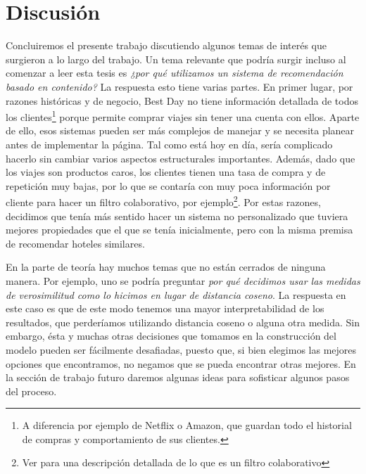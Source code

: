 \documentclass[12pt]{report}
\begin{document}
\section{Discusión}

Concluiremos el presente trabajo discutiendo algunos temas de interés que surgieron a lo largo del trabajo. Un tema relevante que podría surgir incluso al comenzar a leer esta tesis es \emph{¿por qué utilizamos un sistema de recomendación basado en contenido?} La respuesta esto tiene varias partes. En primer lugar, por razones históricas y de negocio, Best Day no tiene información detallada de todos los clientes\footnote{A diferencia por ejemplo de Netflix o Amazon, que guardan todo el historial de compras y comportamiento de sus clientes.} porque permite comprar viajes sin tener una cuenta con ellos. Aparte de ello, esos sistemas pueden ser más complejos de manejar y se necesita planear antes de implementar la página. Tal como está hoy en día, sería complicado hacerlo sin cambiar varios aspectos estructurales importantes. Además, dado que los viajes son productos caros, los clientes tienen una tasa de compra y de repetición muy bajas, por lo que se contaría con muy poca información por cliente para hacer un filtro colaborativo, por ejemplo\footnote{Ver \cite{mmds} para una descripción detallada de lo que es un filtro colaborativo}. Por estas razones, decidimos que tenía más sentido hacer un sistema no personalizado que tuviera mejores propiedades que el que se tenía inicialmente, pero con la misma premisa de recomendar hoteles similares.

En la parte de teoría hay muchos temas que no están cerrados de ninguna manera. Por ejemplo, uno se podría preguntar \emph{por qué decidimos usar las medidas de verosimilitud como lo hicimos en lugar de distancia coseno}. La respuesta en este caso es que de este modo tenemos una mayor interpretabilidad de los resultados, que perderíamos utilizando distancia coseno o alguna otra medida. Sin embargo, ésta y muchas otras decisiones que tomamos en la construcción del modelo pueden ser fácilmente desafiadas, puesto que, si bien elegimos las mejores opciones que encontramos, no negamos que se pueda encontrar otras mejores. En la sección de trabajo futuro daremos algunas ideas para sofisticar algunos pasos del proceso.
\end{document}
